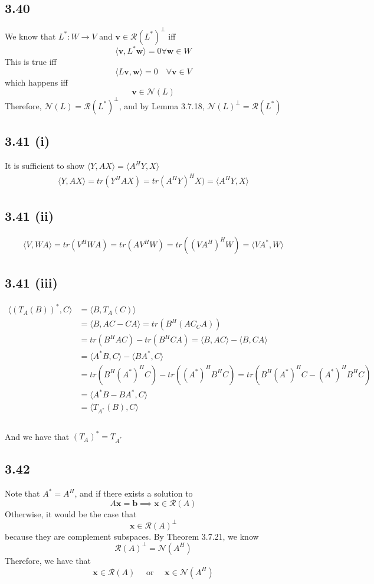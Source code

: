 \documentclass[letterpaper,12pt]{article}
\theoremstyle{definition}
\begin{document}
\subsection*{3.40}
We know that $L^*:W\rightarrow V$ and $\mathbf{v}\in \mathscr{R}(L^*)^\bot$ iff 
\[\langle \mathbf{v}, L^* \mathbf{w} \rangle = 0 \forall \mathbf{w} \in W\]
This is true iff 
\[\langle L\mathbf{v}, \mathbf{w} \rangle =0 \quad \forall \mathbf{v} \in V\]
which happens iff 
\[\mathbf{v} \in \mathscr{N}(L)\]
Therefore, $\mathscr{N}(L) = \mathscr{R}(L^*)^{\bot}$, and by Lemma 3.7.18, $\mathscr{N}(L)^\bot = \mathscr{R}(L^*)$


\subsection*{3.41 (i)}
It is sufficient to show $\langle Y,AX\rangle = \langle A^HY,X\rangle$\\
\begin{align*}
\langle Y, AX\rangle = tr(Y^HAX) = tr(A^HY)^HX)= \langle A^HY,X\rangle
\end{align*}
\subsection*{3.41 (ii)}
\begin{align*}
\langle V,WA \rangle = tr(V^HWA) = tr(AV^HW) = tr((VA^H)^HW)=\langle VA^*,W\rangle
\end{align*}
\subsection*{3.41 (iii)}
\begin{align*}
    \langle (T_A(B))^*,C\rangle & = \langle B,T_A(C)\rangle\\
    & = \langle B, AC-CA \rangle = tr(B^H(AC_CA))  \\ 
    & =tr(B^HAC)-tr(B^HCA)=\langle B,AC\rangle -\langle B,CA\rangle\\
    & = \langle A^*B,C\rangle - \langle BA^*,C\rangle \\
    & = tr(B^H(A^*)^HC)-tr((A^*)^HB^HC) = tr(B^H(A^*)^HC-(A^*)^HB^HC)\\ 
    & = \langle A^*B-BA^*,C\rangle\\
    & = \langle T_{A^*}(B),C\rangle \\
\end{align*}\\
And we have that $(T_A)^* = T_{A^*}$

\subsection*{3.42}
Note that $A^* = A^H$, and if there exists a solution to 
\[A \mathbf{x} = \mathbf{b}  \implies \mathbf{x} \in \mathscr{R}(A)\]
Otherwise, it would be the case that 
\[\mathbf{x} \in \mathscr{R}(A)^\bot\]
because they are complement subspaces. By Theorem 3.7.21, we know 
\[\mathscr{R}(A)^\bot = \mathscr{N}(A^H)\]
Therefore, we have that \[\mathbf{x} \in \mathscr{R}(A) \quad \text{ or }\quad \mathbf{x} \in \mathscr{N}(A^H)\]
\end{document}

